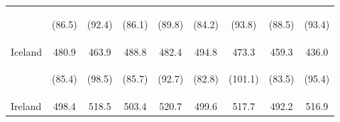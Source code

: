 \begin{center}
\begin{tabular}{lcccccccc}
 & \begin{footnotesize}(86.5)\end{footnotesize} & \begin{footnotesize}(92.4)\end{footnotesize} & \begin{footnotesize}(86.1)\end{footnotesize} & \begin{footnotesize}(89.8)\end{footnotesize} & \begin{footnotesize}(84.2)\end{footnotesize} & \begin{footnotesize}(93.8)\end{footnotesize} & \begin{footnotesize}(88.5)\end{footnotesize} & \begin{footnotesize}(93.4)\end{footnotesize}\\
\noalign{\smallskip}Iceland & 480.9 & 463.9 & 488.8 & 482.4 & 494.8 & 473.3 & 459.3 & 436.0\\
 & \begin{footnotesize}(85.4)\end{footnotesize} & \begin{footnotesize}(98.5)\end{footnotesize} & \begin{footnotesize}(85.7)\end{footnotesize} & \begin{footnotesize}(92.7)\end{footnotesize} & \begin{footnotesize}(82.8)\end{footnotesize} & \begin{footnotesize}(101.1)\end{footnotesize} & \begin{footnotesize}(83.5)\end{footnotesize} & \begin{footnotesize}(95.4)\end{footnotesize}\\
\noalign{\smallskip}Ireland & 498.4 & 518.5 & 503.4 & 520.7 & 499.6 & 517.7 & 492.2 & 516.9\\

\end{tabular}
\end{center}
